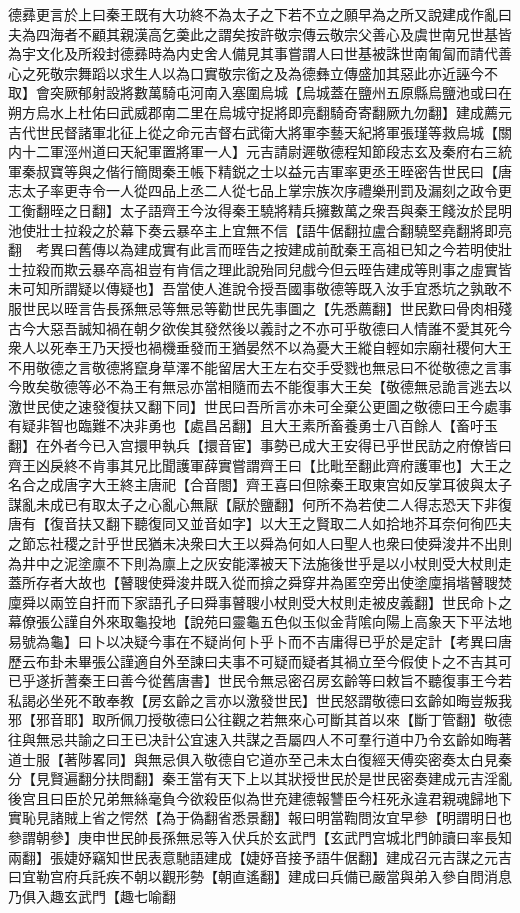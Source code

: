 德彞更言於上曰秦王既有大功終不為太子之下若不立之願早為之所又說建成作亂曰夫為四海者不顧其親漢高乞羮此之謂矣按許敬宗傳云敬宗父善心及虞世南兄世基皆為宇文化及所殺封德彞時為内史舍人備見其事嘗謂人曰世基被誅世南匍匐而請代善心之死敬宗舞蹈以求生人以為口實敬宗銜之及為德彝立傳盛加其惡此亦近誣今不取】會突厥郁射設將數萬騎屯河南入塞圍烏城【烏城蓋在鹽州五原縣烏鹽池或曰在朔方烏水上杜佑曰武威郡南二里在烏城守捉將即亮翻騎奇寄翻厥九勿翻】建成薦元吉代世民督諸軍北征上從之命元吉督右武衛大將軍李藝天紀將軍張瑾等救烏城【關内十二軍涇州道曰天紀軍置將軍一人】元吉請尉遲敬德程知節段志玄及秦府右三統軍秦叔寶等與之偕行簡閲秦王帳下精鋭之士以益元吉軍率更丞王晊密告世民曰【唐志太子率更寺令一人從四品上丞二人從七品上掌宗族次序禮樂刑罰及漏刻之政令更工衡翻晊之日翻】太子語齊王今汝得秦王驍將精兵擁數萬之衆吾與秦王餞汝於昆明池使壯士拉殺之於幕下奏云暴卒主上宜無不信【語牛倨翻拉盧合翻驍堅堯翻將即亮翻　考異曰舊傳以為建成實有此言而晊告之按建成前酖秦王高祖已知之今若明使壯士拉殺而欺云暴卒高祖豈有肯信之理此說殆同兒戲今但云晊告建成等則事之虛實皆未可知所謂疑以傳疑也】吾當使人進說令授吾國事敬德等既入汝手宜悉坑之孰敢不服世民以晊言告長孫無忌等無忌等勸世民先事圖之【先悉薦翻】世民歎曰骨肉相殘古今大惡吾誠知禍在朝夕欲俟其發然後以義討之不亦可乎敬德曰人情誰不愛其死今衆人以死奉王乃天授也禍機垂發而王猶晏然不以為憂大王縱自輕如宗廟社稷何大王不用敬德之言敬德將竄身草澤不能留居大王左右交手受戮也無忌曰不從敬德之言事今敗矣敬德等必不為王有無忌亦當相隨而去不能復事大王矣【敬德無忌詭言逃去以激世民使之速發復扶又翻下同】世民曰吾所言亦未可全棄公更圖之敬德曰王今處事有疑非智也臨難不决非勇也【處昌呂翻】且大王素所畜養勇士八百餘人【畜吁玉翻】在外者今已入宫擐甲執兵【擐音宦】事勢已成大王安得已乎世民訪之府僚皆曰齊王凶戾終不肯事其兄比聞護軍薛實嘗謂齊王曰【比毗至翻此齊府護軍也】大王之名合之成唐字大王終主唐祀【合音閤】齊王喜曰但除秦王取東宫如反掌耳彼與太子謀亂未成已有取太子之心亂心無厭【厭於鹽翻】何所不為若使二人得志恐天下非復唐有【復音扶又翻下聽復同又並音如字】以大王之賢取二人如拾地芥耳奈何徇匹夫之節忘社稷之計乎世民猶未决衆曰大王以舜為何如人曰聖人也衆曰使舜浚井不出則為井中之泥塗廪不下則為廪上之灰安能澤被天下法施後世乎是以小杖則受大杖則走蓋所存者大故也【瞽䏂使舜浚井既入從而揜之舜穿井為匿空旁出使塗廩捐堦瞽䏂焚廩舜以兩笠自扞而下家語孔子曰舜事瞽䏂小杖則受大杖則走被皮義翻】世民命卜之幕僚張公謹自外來取龜投地【說苑曰靈龜五色似玉似金背隂向陽上高象天下平法地易號為龜】曰卜以决疑今事在不疑尚何卜乎卜而不吉庸得已乎於是定計【考異曰唐歷云布卦未畢張公謹適自外至諫曰夫事不可疑而疑者其禍立至今假使卜之不吉其可已乎遂折蓍秦王曰善今從舊唐書】世民令無忌密召房玄齡等曰敕旨不聽復事王今若私謁必坐死不敢奉教【房玄齡之言亦以激發世民】世民怒謂敬德曰玄齡如晦豈叛我邪【邪音耶】取所佩刀授敬德曰公往觀之若無來心可斷其首以來【斷丁管翻】敬德往與無忌共諭之曰王已决計公宜速入共謀之吾屬四人不可羣行道中乃令玄齡如晦著道士服【著陟畧同】與無忌俱入敬德自它道亦至己未太白復經天傅奕密奏太白見秦分【見賢遍翻分扶問翻】秦王當有天下上以其狀授世民於是世民密奏建成元吉淫亂後宫且曰臣於兄弟無絲毫負今欲殺臣似為世充建德報讐臣今枉死永違君親魂歸地下實恥見諸賊上省之愕然【為于偽翻省悉景翻】報曰明當鞫問汝宜早參【明謂明日也參謂朝參】庚申世民帥長孫無忌等入伏兵於玄武門【玄武門宫城北門帥讀曰率長知兩翻】張婕妤竊知世民表意馳語建成【婕妤音接予語牛倨翻】建成召元吉謀之元吉曰宜勒宫府兵託疾不朝以觀形勢【朝直遙翻】建成曰兵備已嚴當與弟入參自問消息乃俱入趣玄武門【趣七喻翻